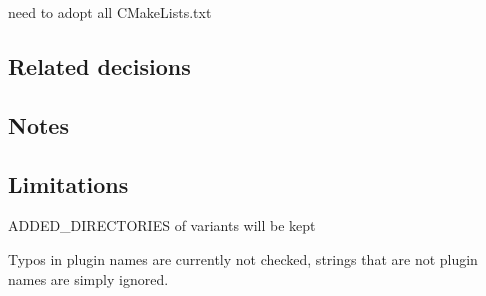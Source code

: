 \begin{DoxyItemize}
\item need to adopt all C\+Make\+Lists.\+txt
\end{DoxyItemize}

\subsection*{Related decisions}

\subsection*{Notes}

\subsection*{Limitations}


\begin{DoxyItemize}
\item {\ttfamily A\+D\+D\+E\+D\+\_\+\+D\+I\+R\+E\+C\+T\+O\+R\+I\+E\+S} of variants will be kept
\item Typos in plugin names are currently not checked, strings that are not plugin names are simply ignored. 
\end{DoxyItemize}
